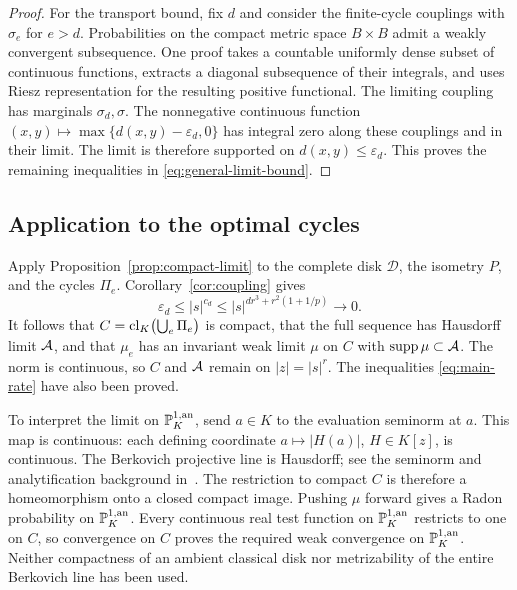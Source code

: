 \begin{proof}
For the transport bound, fix $d$ and consider the finite-cycle
couplings with $\sigma_e$ for $e>d$. Probabilities on the compact
metric space $B\times B$ admit a weakly convergent subsequence.
One proof takes a countable uniformly dense subset of continuous
functions, extracts a diagonal subsequence of their integrals, and
uses Riesz representation for the resulting positive functional.
The limiting coupling has marginals $\sigma_d,\sigma$. The
nonnegative continuous function $(x,y)\mapsto
\max\{d(x,y)-\varepsilon_d,0\}$ has integral zero along these
couplings and in their limit. The limit is therefore supported on
$d(x,y)\le\varepsilon_d$. This proves the remaining inequalities
in \eqref{eq:general-limit-bound}.
\end{proof}

\subsection{Application to the optimal cycles}
Apply Proposition~\ref{prop:compact-limit} to the complete disk
$\mathcal D$, the isometry $P$, and the cycles $\Pi_e$.
Corollary~\ref{cor:coupling} gives
\[
 \varepsilon_d\le |s|^{c_d}
 \le |s|^{d r^3+r^2(1+1/p)}\longrightarrow0.
\]
It follows that $C=\operatorname{cl}_K\bigl(\bigcup_e\Pi_e\bigr)$ is compact,
that the full sequence has Hausdorff limit $\mathcal A$, and that
$\mu_e$ has an invariant weak limit $\mu$ on $C$ with
$\operatorname{supp}\mu\subset\mathcal A$. The norm is continuous, so $C$ and $\mathcal A$
remain on $|z|=|s|^r$. The inequalities
\eqref{eq:main-rate} have also been proved.

To interpret the limit on $\mathbb P^{1,\mathrm{an}}_K$, send $a\in K$ to the evaluation
seminorm at $a$. This map is continuous: each defining coordinate
$a\mapsto|H(a)|$, $H\in K[z]$, is continuous. The Berkovich
projective line is Hausdorff; see the seminorm and analytification
background in~\cite[Sections 2.3--2.4]{baker2007berkovich}.
The restriction to compact $C$ is therefore a homeomorphism onto
a closed compact image. Pushing $\mu$ forward gives a Radon
probability on $\mathbb P^{1,\mathrm{an}}_K$. Every continuous real test function on
$\mathbb P^{1,\mathrm{an}}_K$ restricts to one on $C$, so convergence on $C$ proves
the required weak convergence on $\mathbb P^{1,\mathrm{an}}_K$. Neither compactness of
an ambient classical disk nor metrizability of the entire Berkovich
line has been used.

